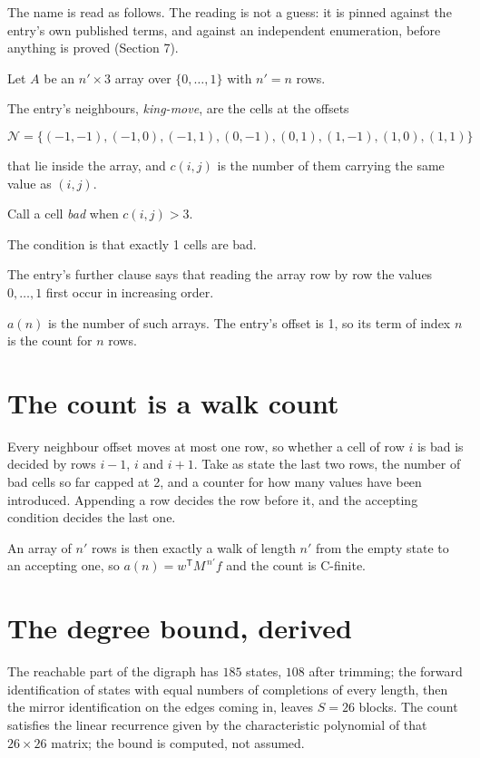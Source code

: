 \documentclass[11pt]{article}
\theoremstyle{definition}
\begin{document}
The name is read as follows. The reading is not a guess: it is pinned against the entry's own published terms, and against an independent enumeration, before anything is proved (Section 7).

Let $A$ be an $n' \times 3$ array over $\{0,\dots,1\}$ with $n' = n$ rows.

The entry's neighbours, {\itshape king-move}, are the cells at the offsets

\[\mathcal{N} = \{(-1,-1), (-1,0), (-1,1), (0,-1), (0,1), (1,-1), (1,0), (1,1)\}\]

that lie inside the array, and $c(i,j)$ is the number of them carrying the same value as $(i,j)$.

Call a cell {\itshape bad} when $c(i,j) > 3$.

The condition is that exactly 1 cells are bad.

The entry's further clause says that reading the array row by row the values $0,\dots,1$ first occur in increasing order.

$a(n)$ is the number of such arrays. The entry's offset is 1, so its term of index $n$ is the count for $n$ rows.

\section{The count is a walk count}

Every neighbour offset moves at most one row, so whether a cell of row $i$ is bad is decided by rows $i-1$, $i$ and $i+1$. Take as state the last two rows, the number of bad cells so far capped at 2, and a counter for how many values have been introduced. Appending a row decides the row before it, and the accepting condition decides the last one.

An array of $n'$ rows is then exactly a walk of length $n'$ from the empty state to an accepting one, so $a(n) = w^{\mathsf T}M^{\,n'}f$ and the count is C-finite.

\section{The degree bound, derived}

The reachable part of the digraph has $185$ states, $108$ after trimming; the forward identification of states with equal numbers of completions of every length, then the mirror identification on the edges coming in, leaves $S = 26$ blocks. The count satisfies the linear recurrence given by the characteristic polynomial of that $26\times26$ matrix; the bound is computed, not assumed.
\end{document}
